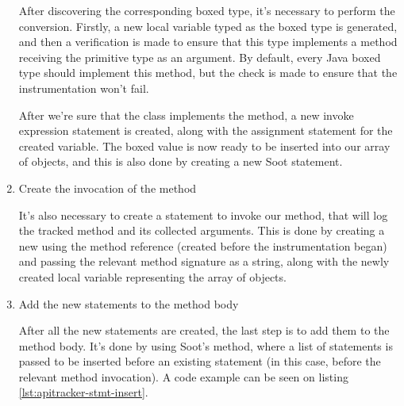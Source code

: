 \begin{enumerate}
        After discovering the corresponding boxed type, it's necessary to perform the conversion. Firstly, a new local variable typed as the boxed type is generated, and then a verification is made to ensure that this type implements a  method receiving the primitive type as an argument. By default, every Java boxed type should implement this method, but the check is made to ensure that the instrumentation won't fail.

        After we're sure that the class implements the  method, a new invoke expression statement is created, along with the assignment statement for the created variable. The boxed value is now ready to be inserted into our array of objects, and this is also done by creating a new Soot statement.

    \item Create the invocation of the  method

    It's also necessary to create a statement to invoke our  method, that will log the tracked method and its collected arguments. This is done by creating a new  using the  method reference (created before the instrumentation began) and passing the relevant method signature as a string, along with the newly created local variable representing the array of objects.

    \item Add the new statements to the method body

    After all the new statements are created, the last step is to add them to the method body. It's done by using Soot's  method, where a list of statements is passed to be inserted before an existing statement (in this case, before the relevant method invocation). A code example can be seen on listing \ref{lst:apitracker-stmt-insert}.
\end{enumerate}

